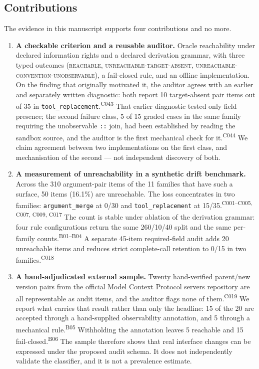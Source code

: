 \documentclass[11pt]{article}
\newcommand{\ledger}[1]{\textsuperscript{\textsf{\scriptsize #1}}}
\newcommand{\st}[1]{\textsc{\small #1}}
\newcommand{\dfam}[1]{\texttt{#1}}
\begin{document}
\subsection{Contributions}

The evidence in this manuscript supports four contributions and no more.

\begin{enumerate}
  \item \textbf{A checkable criterion and a reusable auditor.} Oracle
  reachability under declared information rights and a declared derivation
  grammar, with three typed outcomes (\st{reachable},
  \st{unreachable-target-absent}, \st{unreachable-convention-unobservable}), a
  fail-closed rule, and an offline implementation. On the finding that
  originally motivated it, the auditor agrees with an earlier and separately
  written diagnostic: both report 10 target-absent pair items out of 35 in
  \dfam{tool\_replacement}.\ledger{C043} That earlier diagnostic tested only
  field presence; the second failure class, 5 of 15 graded cases in the same
  family requiring the unobservable \texttt{::} join, had been established by
  reading the sandbox source, and the auditor is the first mechanical check for
  it.\ledger{C044} We claim agreement between two implementations on the first
  class, and mechanisation of the second --- not independent discovery of
  both.

  \item \textbf{A measurement of unreachability in a synthetic drift
  benchmark.} Across the 310 argument-pair items of the 11 families that have
  such a surface, 50 items (16.1\%) are unreachable. The loss concentrates in two families:
  \dfam{argument\_merge} at 0/30 and \dfam{tool\_replacement}
  at 15/35.\ledger{C001--C005, C007, C009, C017}
  The count is stable under
  ablation of the derivation grammar: four rule configurations return the same
  260/10/40 split and the same per-family counts.\ledger{B01--B04} A separate
  45-item required-field audit adds 20 unreachable items and reduces strict
  complete-call retention to 0/15 in two families.\ledger{C018}

  \item \textbf{A hand-adjudicated external sample.} Twenty hand-verified
  parent/new version pairs from the official Model Context Protocol servers
  repository are all representable as audit items, and the auditor flags none
  of them.\ledger{C019} We report what carries that result rather than only the
  headline: 15 of the 20 are accepted through a hand-supplied observability
  annotation, and 5 through a mechanical rule.\ledger{B05} Withholding the
  annotation leaves 5 reachable and 15 fail-closed.\ledger{B06} The sample
  therefore shows that real interface changes can be expressed under the
  proposed audit schema. It does not independently validate the classifier,
  and it is not a prevalence estimate.


\end{enumerate}
\end{document}
